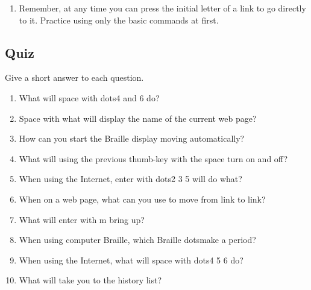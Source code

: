 \documentclass[10pt,letterpaper,twoside]{report}
\begin{document}
{{{\begin{enumerate}
\begin{enumerate}
\begin{enumerate}
			            \item set the current page as the home page
			            \item go to your home page
			            \item manage internet files
			            \item go to the display settings
			            \item print the current web page
			            \item check the error status
			            \item Enter with lower h (dots2 3 6 will go to the history list).
			            \item Space with dots1 3 will go to the previous input control.  Space with dots4 and 6 will go to the next input control.  Space with dots1 3 4 6 will read the current input control.
			            \item Space with b will take you to the block commands menu.
			            \item To access the spelling checker, use space with dots1 6.
			            \item Space with s will save a file.
		            \end{enumerate}
	      \end{enumerate}
	\item Remember, at any time you can press the initial letter of a link to go directly to it.  Practice using only the basic commands at first.
\end{enumerate}
\clearpage
\subsection{Quiz}
Give a short answer to each question.
\begin{enumerate}
	\item What will space with dots4 and 6 do?
	\item Space with what will display the name of the current web page?
	\item How can you start the Braille display moving automatically?
	\item What will using the previous thumb-key with the space turn on and off?
	\item When using the Internet, enter with dots2 3 5 will do what?
	\item When on a web page, what can you use to move from link to link?
	\item What will enter with m bring up?
	\item When using computer Braille, which Braille dotsmake a period?
	\item When using the Internet, what will space with dots4 5 6 do?
	\item What will take you to the history list?
\end{enumerate}
\clearpage
}}}
\end{document}
